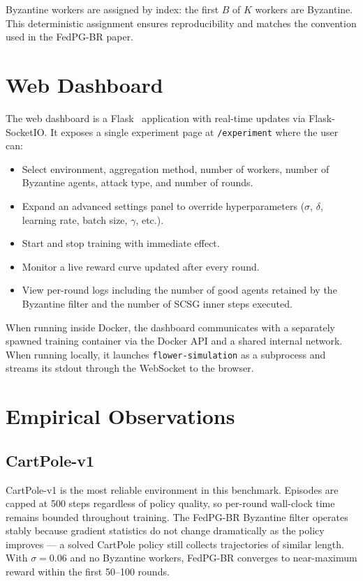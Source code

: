 Byzantine workers are assigned by index: the first $B$ of $K$ workers are
Byzantine. This deterministic assignment ensures reproducibility and matches
the convention used in the FedPG-BR paper.

\section{Web Dashboard}

The web dashboard is a Flask~\cite{pallets2023flask} application with real-time
updates via Flask-SocketIO. It exposes a single experiment page at
\texttt{/experiment} where the user can:

\begin{itemize}
    \item Select environment, aggregation method, number of workers, number of
          Byzantine agents, attack type, and number of rounds.
    \item Expand an advanced settings panel to override hyperparameters
          ($\sigma$, $\delta$, learning rate, batch size, $\gamma$, etc.).
    \item Start and stop training with immediate effect.
    \item Monitor a live reward curve updated after every round.
    \item View per-round logs including the number of good agents retained by
          the Byzantine filter and the number of SCSG inner steps executed.
\end{itemize}

When running inside Docker, the dashboard communicates with a separately
spawned training container via the Docker API and a shared internal network.
When running locally, it launches \texttt{flower-simulation} as a subprocess
and streams its stdout through the WebSocket to the browser.

\section{Empirical Observations}

\subsection{CartPole-v1}

CartPole-v1 is the most reliable environment in this benchmark. Episodes are
capped at 500 steps regardless of policy quality, so per-round wall-clock time
remains bounded throughout training. The FedPG-BR Byzantine filter operates
stably because gradient statistics do not change dramatically as the policy
improves --- a solved CartPole policy still collects trajectories of similar
length. With $\sigma = 0.06$ and no Byzantine workers, FedPG-BR converges to
near-maximum reward within the first 50--100 rounds.

